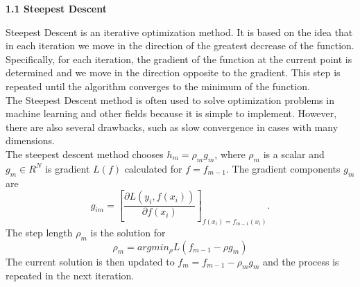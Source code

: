 \documentclass[12pt, letterpaper, twoside]{article}
\begin{document}
\begin{center}
\textbf{\large{1.1  Steepest Descent}} 
\end{center}
\hspace*{4ex} Steepest Descent is an iterative optimization method. It is based on the idea that in each iteration we move in the direction of the greatest decrease of the function.\\
\hspace*{4ex} Specifically, for each iteration, the gradient of the function at the current point is determined and we move in the direction opposite to the gradient. This step is repeated until the algorithm converges to the minimum of the function.\\
\hspace*{4ex}The Steepest Descent method is often used to solve optimization problems in machine learning and other fields because it is simple to implement. However, there are also several drawbacks, such as slow convergence in cases with many dimensions.\\
The steepest descent method chooses $h_m=\rho_mg_m$, where $\rho_m$ is a scalar and $g_m \in R^N$ is gradient $L(f)$ calculated for $f=f_{m-1}$. The gradient components $g_m$ are
\begin{equation*}
g_{im}=[\frac{\partial L(y_i,f(x_i))}{\partial f(x_i)}]_{f(x_i)=f_{m-1}(x_i)}.
\end{equation*}
The step length $\rho_m$ is the solution for
\begin{equation*}
\rho_m=argmin_{\rho}L(f_{m-1}-\rho g_m)
\end{equation*}
The current solution is then updated to $f_m = f_{m−1}− \rho_m g_m$ and the process is repeated in the next iteration.
\pagebreak
\end{document}
